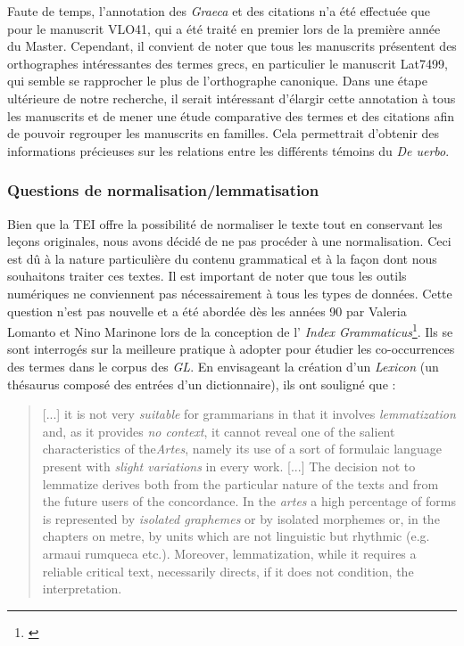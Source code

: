 \documentclass[a4paper, twoside, 12pt]{book}
\begin{document}
Faute de temps, l'annotation des \textit{Graeca} et des citations n'a été effectuée que pour le manuscrit VLO41, qui a été traité en premier lors de la première année du Master. Cependant, il convient de noter que tous les manuscrits présentent des orthographes intéressantes des termes grecs, en particulier le manuscrit Lat7499, qui semble se rapprocher le plus de l'orthographe canonique. Dans une étape ultérieure de notre recherche, il serait intéressant d'élargir cette annotation à tous les manuscrits et de mener une étude comparative des termes et des citations afin de pouvoir regrouper les manuscrits en familles. Cela permettrait d'obtenir des informations précieuses sur les relations entre les différents témoins du \textit{De uerbo}.\\


\subsubsection{Questions de normalisation/lemmatisation}

Bien que la TEI offre la possibilité de normaliser le texte tout en conservant les leçons originales, nous avons décidé de ne pas procéder à une normalisation. Ceci est dû à la nature particulière du contenu grammatical et à la façon dont nous souhaitons traiter ces textes. Il est important de noter que tous les outils numériques ne conviennent pas nécessairement à tous les types de données. Cette question n'est pas nouvelle et a été abordée dès les années 90 par Valeria Lomanto et Nino Marinone lors de la conception de l' \textit{Index Grammaticus}\footnote{\cite{lomanto1990concordance}}. Ils se sont interrogés sur la meilleure pratique à adopter pour étudier les co-occurrences des termes dans le corpus des \textit{GL}. En envisageant la création d'un \textit{Lexicon} (un thésaurus composé des entrées d'un dictionnaire), ils ont souligné que : \blockquote{[...] it is not very \textit{suitable} for grammarians in that it involves \textit{lemmatization} and, as it provides \textit{no context}, it cannot reveal one of the salient characteristics of the\textit{Artes}, namely its use of a sort of formulaic language present with \textit{slight variations} in every work. [...] The decision not to lemmatize derives both from the particular nature of the texts and from the future users of the concordance. In the \textit{artes} a high percentage of forms is represented by \textit{isolated graphemes} or by isolated morphemes or, in the chapters on metre, by units which are not linguistic but rhythmic (e.g. armaui rumqueca etc.). Moreover, lemmatization, while it requires a reliable critical text, necessarily
directs, if it does not condition, the interpretation.}
\end{document}
